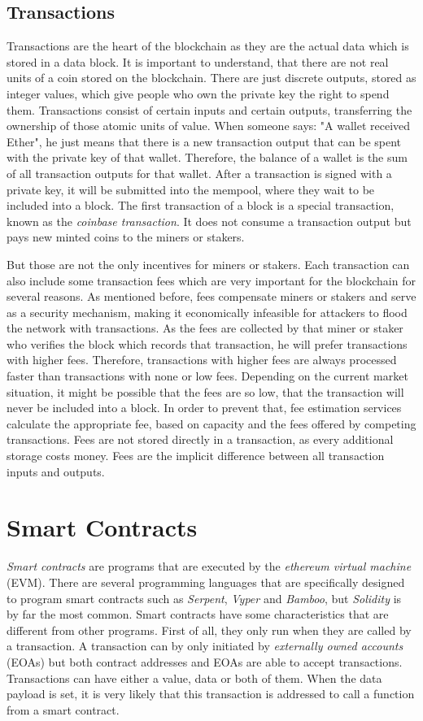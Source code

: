 \subsection{Transactions}
Transactions are the heart of the blockchain as they are the actual data which is stored in a data block. It is important to understand, that there are not real
units of a coin stored on the blockchain. There are just discrete outputs, stored as integer values, which give people who own the private key the right to spend
them. Transactions consist of certain inputs and certain outputs, transferring the ownership of those atomic units of value. When someone says: "A wallet received
Ether", he just means that there is a new transaction output that can be spent with the private key of that wallet. Therefore, the balance of a wallet is the sum of
all transaction outputs for that wallet. After a transaction is signed with a private key, it will be submitted into the mempool, where they wait to be included into
a block. The first transaction of a block is a special transaction, known as the \textit{coinbase transaction}. It does not consume a transaction output but pays new minted coins to the miners or stakers.

But those are not the only incentives for miners or stakers. Each transaction can also include some transaction fees which are very important
for the blockchain for several reasons. As mentioned before, fees compensate miners or stakers and serve as a security mechanism, making it economically infeasible for attackers
to flood the network with transactions. As the fees are collected by that miner or staker who verifies the block which records that transaction, he will prefer transactions with
higher fees. Therefore, transactions with higher fees are always processed faster than transactions with none or low fees. Depending on the current market situation,
it might be possible that the fees are so low, that the transaction will never be included into a block. In order to prevent that, fee estimation services calculate
the appropriate fee, based on capacity and the fees offered by competing transactions. Fees are not stored directly in a transaction, as every additional storage
costs money. Fees are the implicit difference between all transaction inputs and outputs.

\section{Smart Contracts}
\textit{Smart contracts} are programs that are executed by the \textit{ethereum virtual machine} (EVM). There are several programming languages that are specifically designed to
program smart contracts such as \textit{Serpent}, \textit{Vyper} and \textit{Bamboo}, but \textit{Solidity} is by far the most common. Smart contracts have some characteristics that are different from
other programs. First of all, they only run when they are called by a transaction. A transaction can by only initiated by \textit{externally owned accounts} (EOAs) but both
contract addresses and EOAs are able to accept transactions. Transactions can have either a value, data or both of them. When the data payload is set, it is very
likely that this transaction is addressed to call a function from a smart contract.

